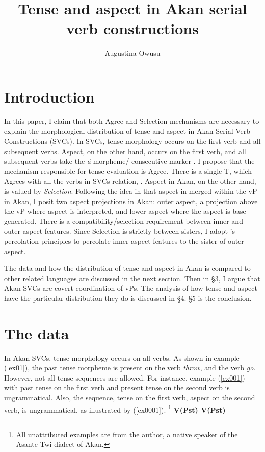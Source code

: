 \documentclass[output=paper,colorlinks,citecolor=brown]{langscibook}
\title{Tense and aspect in Akan serial verb constructions}
\author{Augustina Owusu\affiliation{Rutgers University}}
\begin{document}
\maketitle 

\section{Introduction}\label{sec:owusu:1}

In this paper, I claim that both Agree and Selection mechanisms are necessary to explain the morphological distribution of tense and aspect in Akan Serial Verb Constructions (SVCs). In SVCs, tense morphology occurs on the first verb and all subsequent verbs. Aspect, on the other hand, occurs on the first verb, and all subsequent verbs take the \emph{\'a} morpheme/ consecutive marker \citep{Dolphyne1996, Osam2003}. I propose that the mechanism responsible for tense evaluation is Agree. There is a single T, which Agrees with all the verbs in SVCs relation, \citep{PesetskyTorrego2007}.  Aspect in Akan, on the other hand, is valued by \emph{Selection}. Following the idea in \citet{Kandybowicz2010, Kandybowicz2015} that aspect in merged within the vP in Akan, I posit two aspect projections in Akan: outer aspect, a projection above the vP where aspect is interpreted, and lower aspect where the aspect is base generated.  There is a compatibility/selection requirement between inner and outer aspect features. Since Selection is strictly between sisters, I adopt \citet{Webelhuth1992}'s percolation principles to percolate inner aspect features to the sister of outer aspect.

The data and how the distribution of tense and aspect in Akan is compared to other related languages are discussed in the next section. Then in \S3, I argue that Akan SVCs are covert coordination of vPs. The analysis of how tense and aspect have the particular distribution they do is discussed in \S4. \S5 is the conclusion.  

\section{The data}
In Akan SVCs, tense morphology occurs on all verbs. As shown in example (\ref{ex01}), the past tense morpheme is present on the verb \emph{throw}, and the verb \emph{go}. However, not all tense sequences are allowed. For instance, example (\ref{ex001}) with past tense on the first verb and present tense on the second verb is ungrammatical. Also, the sequence, tense on the first verb, aspect on the second verb, is ungrammatical, as illustrated by (\ref{ex0001}).  
\ea \label{ex0}
\footnote{All unattributed examples are from the author, a native speaker of the Asante Twi dialect of Akan. } 
\ea \textbf{V(Pst) \phantom {} {} {} V(Pst)}
\end{document}
